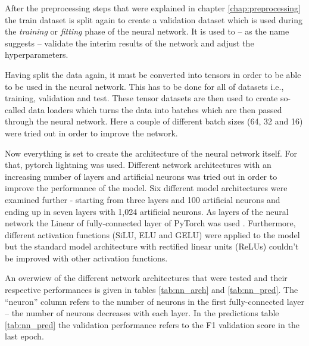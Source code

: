 After the preprocessing steps that were explained in chapter \ref{chap:preprocessing} the train dataset is split again to create a validation dataset which is used during the \textit{training} or \textit{fitting} phase of the neural network. It is used to -- as the name suggests -- validate the interim results of the network and adjust the hyperparameters. \cite[][p. 184]{TanPang-Ning2006}

Having split the data again, it must be converted into tensors in order to be able to be used in the neural network. This has to be done for all of datasets i.e., training, validation and test. These tensor datasets are then used to create so-called data loaders which turns the data into batches which are then passed through the neural network. Here a couple of different batch sizes (64, 32 and 16) were tried out in order to improve the network.

Now everything is set to create the architecture of the neural network itself. For that, pytorch lightning was used. Different network architectures with an increasing number of layers and artificial neurons was tried out in order to improve the performance of the model. Six different model architectures were examined further - starting from three layers and 100 artificial neurons and ending up in seven layers with 1,024 artificial neurons. As layers of the neural network the Linear of fully-connected layer of PyTorch was used \cite{PyTorch2019, PyTorch2021}. Furthermore, different activation functions (SiLU, ELU and GELU) were applied to the model but the standard model architecture with rectified linear units (ReLUs) couldn't be improved with other activation functions.

An overwiew of the different network architectures that were tested and their respective performances is given in tables \ref{tab:nn_arch} and \ref{tab:nn_pred}. The \enquote{neuron} column refers to the number of neurons in the first fully-connected layer -- the number of neurons decreases with each layer. In the predictions table \ref{tab:nn_pred} the validation performance refers to the F1 validation score in the last epoch.